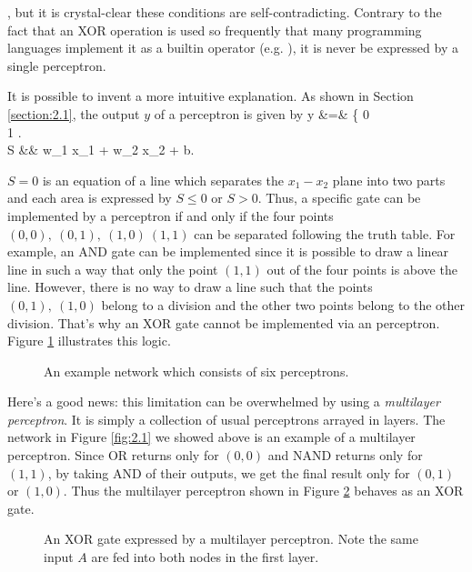 \documentclass{article}
\theoremstyle{definition}
\newcommand{\sect}[1]{Section \ref{section:#1}}
\newcommand{\fig}[1]{Figure \ref{fig:#1}}
\begin{document}
, but it is crystal-clear these conditions are self-contradicting. Contrary to the fact that an XOR operation is used so frequently that many programming languages implement it as a builtin operator (e.g. \inline{\textasciicircum}), it is never be expressed by a single perceptron.

\newpage

It is possible to invent a more intuitive explanation. As shown in \sect{2.1}, the output $y$ of a perceptron is given by
\begineq
y &=& \left\{  0  \\ 1  \edarray \right.  \\
S &\equiv& w_1 x_1 + w_2 x_2 + b. 
\edeq

$S = 0$ is an equation of a line which separates the $x_1 - x_2$ plane into two parts and each area is expressed by $S \leq 0$ or $S > 0$. Thus, a specific gate can be implemented by a perceptron if and only if the four points $(0,0),\ (0,1),\ (1,0)\ (1,1)$ can be separated following the truth table. For example, an AND gate can be implemented since it is possible to draw a linear line in such a way that only the point $(1, 1)$ out of the four points is above the line. However, there is no way to draw a line such that the points $(0, 1),\ (1, 0)$ belong to a division and the other two points belong to the other division. That's why an XOR gate cannot be implemented via an perceptron. \fig{2.2} illustrates this logic.

\begin{figure}[H]
    \centering
    \begin{subfigure}[H]{1.0\textwidth}
	\end{subfigure}
    \caption{An example network which consists of six perceptrons.}
    \label{fig:2.2}
\end{figure}

Here's a good news: this limitation can be overwhelmed by using a {\it multilayer perceptron}. It is simply a collection of usual perceptrons arrayed in layers. The network in \fig{2.1} we showed above is an example of a multilayer perceptron. Since OR returns  only for $(0, 0)$ and NAND returns  only for $(1, 1)$, by taking AND of their outputs, we get the final result  only for $(0,1)$ or $(1, 0)$. Thus the multilayer perceptron shown in \fig{2.3} behaves as an XOR gate.

\begin{figure}[H]
    \centering
    \begin{subfigure}[H]{1.0\textwidth}
	\end{subfigure}
    \caption{An XOR gate expressed by a multilayer perceptron. Note the same input $A$ are fed into both nodes in the first layer.}
    \label{fig:2.3}
\end{figure}
\end{document}

